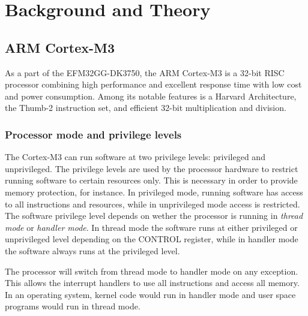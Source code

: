 \chapter{Background and Theory}


\section{ARM Cortex-M3}
As a part of the EFM32GG-DK3750, the ARM Cortex-M3 is a 32-bit RISC processor combining high performance and excellent response time with low cost and power consumption. Among its notable features is a Harvard Architecture, the Thumb-2 instruction set, and efficient 32-bit multiplication and division.

\subsection{Processor mode and privilege levels}
The Cortex-M3 can run software at two privilege levels: privileged and unprivileged. The privilege levels are used by the processor hardware to restrict running software to certain resources only. This is necessary in order to provide memory protection, for instance. In privileged mode, running software has access to all instructions and resources, while in unprivileged mode access is restricted. The software privilege level depends on wether the processor is running in \emph{thread mode} or \emph{handler mode}. In thread mode the software runs at either privileged or unprivileged level depending on the CONTROL register, while in handler mode the software always runs at the privileged level.

The processor will switch from thread mode to handler mode on any exception. This allows the interrupt handlers to use all instructions and access all memory. In an operating system, kernel code would run in handler mode and user space programs would run in thread mode.\cite{CortexM3-RM}

